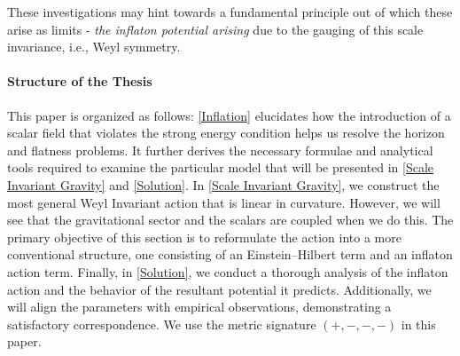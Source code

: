 \documentclass[aps,prd,reprint,preprintnumbers,showpacs,floatfix,nofootinbib,superscript address]{revtex4-2}
\newcommand{\wb}[1]{{\color[RGB]{255,0,0}{\textbf{\textit{[WB: #1]}}}}}
\newcommand{\pcs}[1]{{\color[RGB]{0,100,0}{\textbf{\textit{[PCS: #1]}}}}}
\begin{document}

These investigations may hint towards a fundamental principle out of which these arise as limits - \textit{the inflaton potential arising} due to the gauging of this scale invariance, i.e., Weyl symmetry.

\paragraph*{Structure of the Thesis} This paper is organized as follows: \cref{Inflation} elucidates how the introduction of a scalar field that violates the strong energy condition helps us resolve the horizon and flatness problems. It further derives the necessary formulae and analytical tools required to examine the particular model that will be presented in \cref{Scale Invariant Gravity} and \cref{Solution}. In \cref{Scale Invariant Gravity}, we construct the most general Weyl Invariant action that is linear in curvature. However, we will see that the gravitational sector and the scalars are coupled when we do this. The primary objective of this section is to reformulate the action into a more conventional structure, one consisting of an Einstein--Hilbert term and an inflaton action term. Finally, in \cref{Solution}, we conduct a thorough analysis of the inflaton action and the behavior of the resultant potential it predicts. Additionally, we will align the parameters with empirical observations, demonstrating a satisfactory correspondence. We use the metric signature $(+,-,-,-)$ in this paper.
\end{document}
